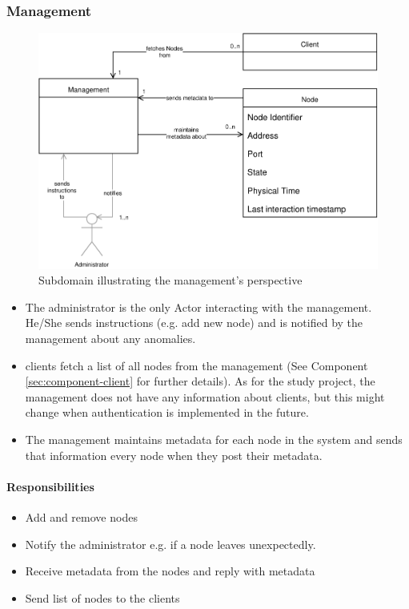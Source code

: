 \subsubsection{Management}\label{sec:component-management}

\begin{figure}[h]
    \centering
    \includegraphics[width=0.75\linewidth]{resources/management_domain_model}
    \caption[Management Subdomain]{Subdomain illustrating the \gls{management}'s perspective}
\end{figure}
\begin{itemize}
    \item The \gls{administrator} is the only Actor interacting with the \gls{management}. He/She sends instructions (e.g. add new \gls{node}) and is notified by the \gls{management} about any anomalies.
    \item \glspl{client} fetch a list of all \glspl{node} from the \gls{management} (See Component \ref{sec:component-client}  for further details). As for the study project, the \gls{management} does not have any information about \glspl{client}, but this might change when authentication is implemented in the future.
    \item The \gls{management} maintains \gls{metadata} for each \gls{node} in the \gls{system} and sends that information every \gls{node} when they post their \gls{metadata}.
\end{itemize}

\paragraph{Responsibilities}
\begin{itemize}
    \item Add and remove \glspl{node}
    \item Notify the \gls{administrator} e.g. if a \gls{node} leaves unexpectedly.
    \item Receive \gls{metadata} from the \glspl{node} and reply with \gls{metadata}
    \item Send list of \glspl{node} to the \glspl{client}
\end{itemize}

